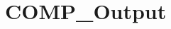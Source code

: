 \hypertarget{group___c_o_m_p___output}{\section{C\-O\-M\-P\-\_\-\-Output}
\label{group___c_o_m_p___output}
}
